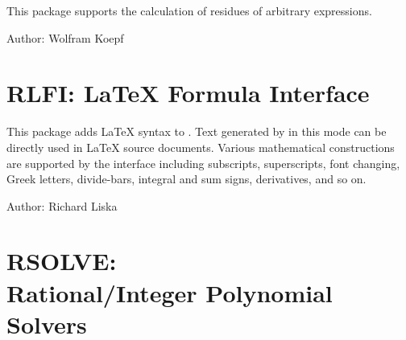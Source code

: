 This package supports the calculation of residues of arbitrary
expressions.

Author: Wolfram Koepf


\fi

\newpage

\section{RLFI: \REDUCE \LaTeX{} Formula Interface}

This package adds \LaTeX{} syntax to \REDUCE.  Text generated by \REDUCE in
this mode can be directly used in \LaTeX{} source documents.  Various
mathematical constructions are supported by the interface including
subscripts, superscripts, font changing, Greek letters, divide-bars,
integral and sum signs, derivatives, and so on.

Author: Richard Liska




\newpage

\iffalse
\section[RSOLVE: Rational/Integer Polynomial Solvers]%
        {RSOLVE: \protect\\ Rational/Integer Polynomial Solvers}

